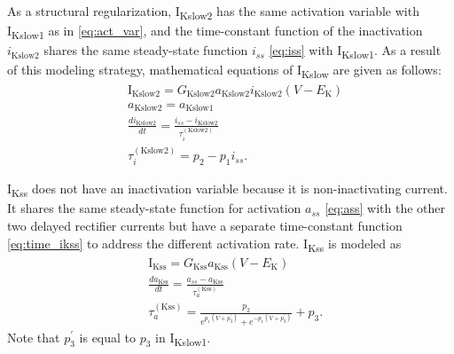 \documentclass[11pt]{article}
\begin{document}
As a structural regularization, I\textsubscript{Kslow2} has the same activation variable with I\textsubscript{Kslow1} as in \eqref{eq:act_var}, and the time-constant function of the inactivation $i_{\mathrm{Kslow2}}$ shares the same steady-state function $i_{ss}$ \eqref{eq:iss} with I\textsubscript{Kslow1}. As a result of this modeling strategy, mathematical equations of I\textsubscript{Kslow} are given as follows:
\begin{align}
    &\mathrm{I}_{\mathrm{Kslow2}} = G_{\mathrm{Kslow2}}a_{\mathrm{Kslow2}}i_{\mathrm{Kslow2}}(V-E_{\mathrm{K}}) \\
    &a_{\mathrm{Kslow2}} = a_{\mathrm{Kslow1}} \label{eq:act_var} \\
    &\frac{di_{\mathrm{Kslow2}}}{dt} = \frac{i_{ss}-i_{\mathrm{Kslow2}}}{\tau_{i}^{(\mathrm{Kslow2})}} \\
    &\tau_{i}^{(\mathrm{Kslow2})} = p_{2} - p_{1}i_{ss}.
\end{align}

I\textsubscript{Kss} does not have an inactivation variable because it is non-inactivating current. It shares the same steady-state function for activation $a_{ss}$ \eqref{eq:ass} with the other two delayed rectifier currents but have a separate time-constant function \eqref{eq:time_ikss} to address the different activation rate. I\textsubscript{Kss} is modeled as
\begin{align}
    &\mathrm{I}_{\mathrm{Kss}} = G_{\mathrm{Kss}}a_{\mathrm{Kss}}(V-E_{\mathrm{K}}) \\
    &\frac{da_{\mathrm{Kss}}}{dt} = \frac{a_{ss}-a_{\mathrm{Kss}}}{\tau_{a}^{(\mathrm{Kss})}} \\
    &\tau_{a}^{(\mathrm{Kss})}= \frac{p_{2}}{e^{p_{1}(V+p_{3}^\prime)}+e^{-p_{1}(V+p_{3}^\prime)}} + p_{3}. \label{eq:time_ikss}
\end{align}
Note that $p_{3}^\prime$ is equal to $p_{3}$ in I\textsubscript{Kslow1}.
\end{document}
